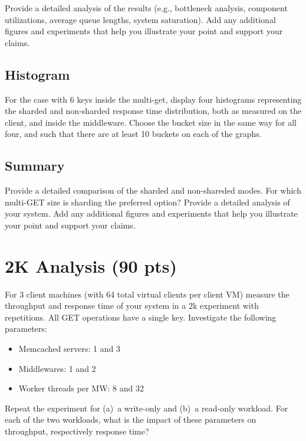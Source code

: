 \documentclass[11pt,a4paper]{article}
\begin{document}
Provide a detailed analysis of the results (e.g., bottleneck analysis, component utilizations, average queue lengths, system saturation). Add any additional figures and experiments that help you illustrate your point and support your claims.

\subsection{Histogram}

For the case with 6 keys inside the multi-get, display four histograms representing the sharded and non-sharded response time distribution, both as measured on the client, and inside the middleware. Choose the bucket size in the same way for all four, and such that there are at least 10 buckets on each of the graphs.

\subsection{Summary}

Provide a detailed comparison of the sharded and non-shareded modes. For which multi-GET size is sharding the preferred option? Provide a detailed analysis of your system. Add any additional figures and experiments that help you illustrate your point and support your claims.

\section{2K Analysis (90 pts)}

For 3 client machines (with 64 total virtual clients per client VM) measure the throughput and response time of your system in a 2k experiment with repetitions. All GET operations have a single key. Investigate the following parameters:

\begin{itemize}
		
	\item Memcached servers: 1 and 3
	\item Middlewares: 1 and 2
	\item Worker threads per MW: 8 and 32
	      	      
\end{itemize}

Repeat the experiment for (a)~a write-only and (b)~a read-only workload.
For each of the two workloads, what is the impact of these parameters on throughput, respectively response time?
\end{document}
